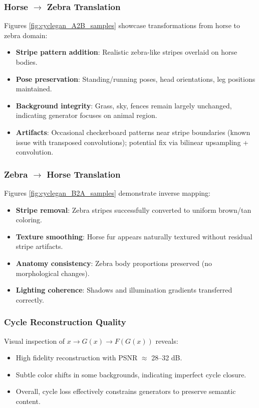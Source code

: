 \documentclass[conference]{IEEEtran}
\begin{document}
\subsubsection{Horse $\to$ Zebra Translation}
Figures \ref{fig:cyclegan_A2B_samples} showcase transformations from horse to zebra domain:
\begin{itemize}
\item \textbf{Stripe pattern addition}: Realistic zebra-like stripes overlaid on horse bodies.
\item \textbf{Pose preservation}: Standing/running poses, head orientations, leg positions maintained.
\item \textbf{Background integrity}: Grass, sky, fences remain largely unchanged, indicating generator focuses on animal region.
\item \textbf{Artifacts}: Occasional checkerboard patterns near stripe boundaries (known issue with transposed convolutions); potential fix via bilinear upsampling + convolution.
\end{itemize}

\subsubsection{Zebra $\to$ Horse Translation}
Figures \ref{fig:cyclegan_B2A_samples} demonstrate inverse mapping:
\begin{itemize}
\item \textbf{Stripe removal}: Zebra stripes successfully converted to uniform brown/tan coloring.
\item \textbf{Texture smoothing}: Horse fur appears naturally textured without residual stripe artifacts.
\item \textbf{Anatomy consistency}: Zebra body proportions preserved (no morphological changes).
\item \textbf{Lighting coherence}: Shadows and illumination gradients transferred correctly.
\end{itemize}

\subsubsection{Cycle Reconstruction Quality}
Visual inspection of $x \to G(x) \to F(G(x))$ reveals:
\begin{itemize}
\item High fidelity reconstruction with PSNR $\approx$ 28–32 dB.
\item Subtle color shifts in some backgrounds, indicating imperfect cycle closure.
\item Overall, cycle loss effectively constrains generators to preserve semantic content.
\end{itemize}
\end{document}
